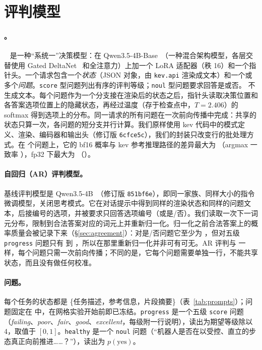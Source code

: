
\section{评判模型}\label{sec:judges}

\paragraph{\kev{}。} \kev{}~\cite{kev4b} 是一种“系统一”决策模型：在 Qwen3.5-4B-Base~\cite{qwen35}（一种混合架构模型，各层交替使用 Gated DeltaNet~\cite{yang2025gated} 和全注意力）上加一个 LoRA 适配器（秩 16）和一个指针头。一个请求包含一个\emph{状态}（JSON 对象，由 \texttt{kev.api} 渲染成文本）和一个或多个\emph{问题}。\texttt{score} 型问题列出有序的评判等级；\texttt{noul} 型问题要求回答是或否。\kev{} 不生成文本。每个问题作为一个分支接在渲染后的状态之后，指针头读取决策位置和各答案选项位置上的隐藏状态，再经过温度（存于检查点中，$T=2.406$）的 softmax 得到选项上的分布。同一请求的所有问题在一次前向传播中完成：共享的状态只算一次，各问题的短分支并行计算。我们原样使用 kev 代码中的模式定义、渲染、编码器和输出头（修订版 \texttt{6cfce5c}），我们的封装只改变行的批处理方式。在  个问题上，它的 bf16 概率与 kev 参考推理路径的差异最大为 （argmax 一致率 ），fp32 下最大为 （）。

\paragraph{自回归（AR）评判模型。} 基线评判模型是 Qwen3.5-4B~\cite{qwen35}（修订版 \texttt{851bf6e}），即同一家族、同样大小的指令微调模型，关闭思考模式。它在对话提示中得到同样的渲染状态和同样的问题文本，后接编号的选项，并被要求只回答选项编号（或是/否）。我们读取一次下一词元分布，限制到合法答案对应的词元上并重新归一化。归一化之前合法答案上的概率质量会被记录下来（\S\ref{sec:agreement}）：对是/否问题它至少为 ，但对五级 \texttt{progress} 问题只有  到 ，所以在那里重新归一化并非可有可无。AR 评判与 \kev{} 一样，每个问题只需一次前向传播；不同的是，它每个问题需要单独一行，不能共享状态，而且没有做任何校准。

\paragraph{问题。} 每个任务的状态都是 \{任务描述，参考信息，片段摘要\}（表~\ref{tab:prompts}）；问题固定在  中，在网格实验开始前即已冻结。\texttt{progress} 是一个五级 \texttt{score} 问题（\emph{failing}、\emph{poor}、\emph{fair}、\emph{good}、\emph{excellent}，每级附一行说明），读出为期望等级除以 4，取值于 $[0,1]$。\texttt{healthy} 是一个 \texttt{noul} 问题（“机器人是否在以受控、直立的步态真正向前推进……？”），读出为 $p(\text{yes})$。

